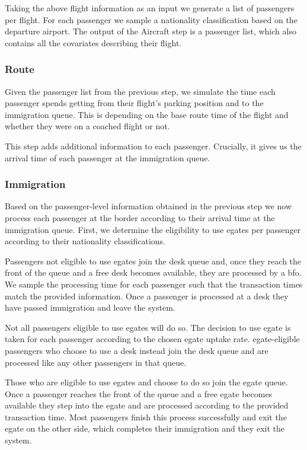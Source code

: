 \documentclass[10pt]{article}
\begin{document}
Taking the above flight information as an input we generate a list of passengers per flight. For each passenger we sample a nationality classification based on the departure airport. The output of the Aircraft step is a passenger list, which also contains all the covariates describing their flight.

\subsubsection{Route}

Given the passenger list from the previous step, we simulate the time each passenger spends getting from their flight's parking position and to the immigration queue. This is depending on the base route time 
of the flight and whether they were on a coached flight or not.

This step adds additional information to each passenger. Crucially, it gives us the arrival time of each passenger at the immigration queue. 

\subsubsection{Immigration}

Based on the passenger-level information obtained in the previous step we now process each passenger at the border according to their arrival time at the immigration queue. First, we determine the eligibility to use \glspl{egate} per passenger according to their nationality classifications. 

Passengers not eligible to use \glspl{egate} join the desk queue and, once they reach the front of the queue and a free desk becomes available, they are processed by a \gls{bfo}. We sample the processing time for each passenger such that the transaction times match the provided information. Once a passenger is processed at a desk they have passed immigration and leave the system.

Not all passengers eligible to use \glspl{egate} will do so. The decision to use \gls{egate} is taken for each passenger according to the chosen \gls{egate} uptake rate. \gls{egate}-eligible passengers who choose to use a desk instead join the desk queue and are processed like any other passengers in that queue. 

Those who are eligible to use \glspl{egate} and choose to do so join the \gls{egate} queue. Once a passenger reaches the front of the queue and a free \gls{egate} becomes available they step into the \gls{egate} and are processed according to the provided transaction time. Most passengers finish this process successfully and exit the \gls{egate} on the other side, which completes their immigration and they exit the system.
\end{document}
